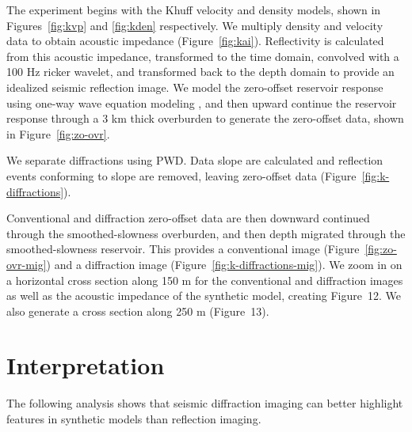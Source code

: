 \par
The experiment begins with the Khuff velocity and density models, shown in Figures~\ref{fig:kvp} and \ref{fig:kden} respectively.  We multiply density and velocity data to obtain acoustic impedance (Figure~\ref{fig:kai}).  Reflectivity is calculated from this acoustic impedance, transformed to the time domain, convolved with a 100 Hz ricker wavelet, and transformed back to the depth domain to provide an idealized seismic reflection image.  We model the zero-offset reservoir response using one-way wave equation modeling  \cite[]{savartm}, and then upward continue the reservoir response through a 3 km thick overburden to generate the zero-offset data, shown in Figure~\ref{fig:zo-ovr}.
\par
We separate diffractions using PWD.  Data slope are calculated and reflection events conforming to slope are removed, leaving zero-offset  data  (Figure~\ref{fig:k-diffractions}).
\par
Conventional and diffraction zero-offset data are then downward continued through the smoothed-slowness overburden, and then depth migrated through the smoothed-slowness reservoir.  This provides a conventional image (Figure~\ref{fig:zo-ovr-mig}) and a diffraction image (Figure~\ref{fig:k-diffractions-mig}).  We zoom in on a horizontal cross section along  150 m for the conventional and diffraction images as well as the acoustic impedance of the synthetic model, creating Figure~12.  We also generate a cross section along  250 m (Figure~13).
\par
\section{Interpretation}
The following analysis shows that seismic diffraction imaging can better highlight  features in synthetic models than reflection imaging.
\par
